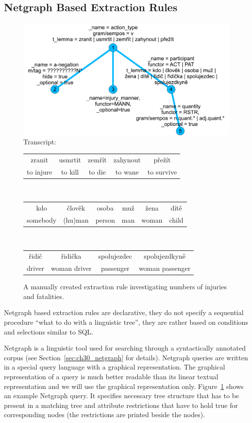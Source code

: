 \subsection{Netgraph Based Extraction Rules}

\begin{figure}
	\centering
		\includegraphics[width=0.5\hsize]{extract_patern}		
\\Transcript:\\
\begin{tabular}{|c|c|c|c|c|}
\hline
zranit & usmrtit & zemřít & zahynout & přežít\\
to injure & to kill & to die & to wane & to survive\\
\hline
\end{tabular}
\\\begin{tabular}{|c|c|c|c|c|c|}
\hline
kdo & člověk & osoba & muž & žena & dítě\\
somebody & (hu)man & person & man & woman & child\\
\hline
\end{tabular}
\\\begin{tabular}{|c|c|c|c|}
\hline
řidič & řidička & spolujezdec & spolujezdkyně\\
driver & woman driver & passenger & woman passenger\\	
\hline
\end{tabular}		
	\caption{A manually created extraction rule investigating numbers of injuries and fatalities.}
	\label{fig:ch50_extract_patern}
\end{figure}



Netgraph based extraction rules are declarative, they do not specify a sequential procedure ``what to do with a linguistic tree'', they are rather based on conditions and selections similar to SQL.

Netgraph is a linguistic tool used for searching through a syntactically annotated corpus (see Section~\ref{sec:ch30_netgraph} for details). Netgraph queries are written in a special query language with a graphical representation. The graphical representation of a query is much better readable than its linear textual representation and we will use the graphical representation only. Figure~\ref{fig:ch50_extract_patern} shows an example Netgraph query. It specifies necessary tree structure that has to be present in a matching tree and attribute restrictions that have to hold true for corresponding nodes (the restrictions are printed beside the nodes).



